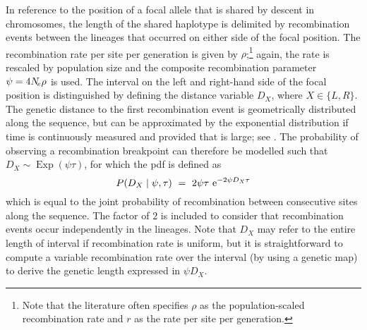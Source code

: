 In reference to the position of a focal allele that is shared by descent in  chromosomes, the length of the shared haplotype is delimited by  recombination events between the  lineages that occurred on either side of the focal position.
The recombination rate per site per generation is given by $\rho$;\footnote{Note that the literature often specifies $\rho$ as the population-scaled recombination rate and $r$ as the rate per site per generation.} again, the rate is rescaled by population size and the composite recombination parameter ${\psi = 4 N_{\!e} \rho}$ is used.
The interval on the left and right-hand side of the focal position is distinguished by defining the distance variable $D_X$, where ${X \in \{L,R\}}$.
The genetic distance to the first recombination event is geometrically distributed along the sequence, but can be approximated by the exponential distribution if time is continuously measured and provided that \Ne is large; \eg see \citet{hein2004gene}.
The probability of observing a recombination breakpoint can therefore be modelled such that ${D_X \sim \operatorname{Exp}(\psi \tau)}$, for which the \gls{pdf} is defined as
\begin{equation}\label{eq:recprob}
	P(D_X \mid \psi,\tau) ~=~ 2 \psi \tau \, \,\mathrm{e}^{-2 \psi D_X \tau}
\end{equation}
which is equal to the joint probability of recombination between consecutive sites along the sequence.
The factor of $2$ is included to consider that recombination events occur independently in the  lineages.
Note that $D_X$ may refer to the entire length of interval if recombination rate is uniform, but it is straightforward to compute a variable recombination rate over the interval (\eg by using a genetic map) to derive the genetic length expressed in ${\psi D_X}$.

